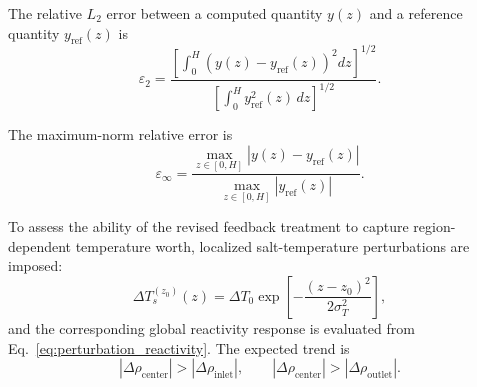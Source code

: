 \documentclass[a4paper,12pt]{article}
\begin{document}
The relative $L_2$ error between a computed quantity $y(z)$ and a
reference quantity $y_{\mathrm{ref}}(z)$ is
\begin{equation}
\varepsilon_{2}
=
\frac{
\left[
\displaystyle
\int_{0}^{H}
\left(
y(z)-y_{\mathrm{ref}}(z)
\right)^2 dz
\right]^{1/2}
}
{
\left[
\displaystyle
\int_{0}^{H}
y_{\mathrm{ref}}^{2}(z)\,dz
\right]^{1/2}
}.
\label{eq:l2_error}
\end{equation}

The maximum-norm relative error is
\begin{equation}
\varepsilon_{\infty}
=
\frac{
\max_{z\in[0,H]}
\left|
y(z)-y_{\mathrm{ref}}(z)
\right|
}
{
\max_{z\in[0,H]}
\left|
y_{\mathrm{ref}}(z)
\right|
}.
\label{eq:linf_error}
\end{equation}

To assess the ability of the revised feedback treatment to capture
region-dependent temperature worth, localized salt-temperature
perturbations are imposed:
\begin{equation}
\Delta T_s^{(z_0)}(z)
=
\Delta T_0
\exp
\left[
-\frac{(z-z_0)^2}{2\sigma_T^2}
\right],
\label{eq:localized_temperature_perturbation}
\end{equation}
and the corresponding global reactivity response is evaluated from
Eq.~\eqref{eq:perturbation_reactivity}. The expected trend is
\begin{equation}
\left|
\Delta\rho_{\mathrm{center}}
\right|
>
\left|
\Delta\rho_{\mathrm{inlet}}
\right|,
\qquad
\left|
\Delta\rho_{\mathrm{center}}
\right|
>
\left|
\Delta\rho_{\mathrm{outlet}}
\right|.
\label{eq:temperature_worth_trend}
\end{equation}
\end{document}
